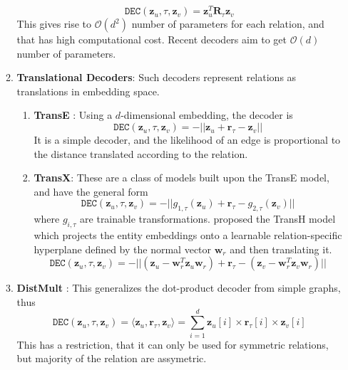\begin{enumerate}
\begin{enumerate}
	\begin{equation}
		\texttt{DEC}(\mathbf{z}_u, \tau, \mathbf{z}_v) = \mathbf{z}_u^T \mathbf{R}_\tau \mathbf{z}_v
	\end{equation}
	 This gives rise to $\mathcal{O}(d^2)$ number of parameters for each relation, and that has high computational cost. Recent decoders aim to get $\mathcal{O}(d)$ number of parameters.
	 \item \textbf{Translational Decoders}: Such decoders represent relations as translations in embedding space. 
	 \begin{enumerate}
	 	\item \textbf{TransE} \cite{transe}: Using a $d$-dimensional embedding, the decoder is
	 	\begin{equation}
	 		\texttt{DEC}(\mathbf{z}_u, \tau, \mathbf{z}_v) = -||\mathbf{z}_u + \mathbf{r}_\tau - \mathbf{z}_v||
	 	\end{equation}
 	It is a simple decoder, and the likelihood of an edge is proportional to the distance translated according to the relation.
 	\item \textbf{TransX}: These are a class of models built upon the TransE model, and have the general form
 	\begin{equation}
 		\texttt{DEC}(\mathbf{z}_u, \tau, \mathbf{z}_v) = -||g_{1, \tau}(\mathbf{z}_u) + \mathbf{r}_\tau - g_{2,\tau}(\mathbf{z}_v)||
 	\end{equation}
 where $g_{i,\tau}$ are trainable transformations. \cite{transh} proposed the TransH model which projects the entity embeddings onto a learnable relation-specific hyperplane defined by the normal vector $\mathbf{w}_r$ and then translating it.
 \begin{equation}
 	\texttt{DEC}(\mathbf{z}_u, \tau, \mathbf{z}_v) = -||(\mathbf{z}_u - \mathbf{w}_r^T \mathbf{z}_u \mathbf{w}_r) + \mathbf{r}_\tau - (\mathbf{z}_v - \mathbf{w}_r^T \mathbf{z}_v \mathbf{w}_r)||
 \end{equation}
	 \end{enumerate}
 \item \textbf{DistMult} \cite{distmult}: This generalizes the dot-product decoder from simple graphs, thus
 \begin{equation}
 	\texttt{DEC}(\mathbf{z}_u, \tau, \mathbf{z}_v) = \langle \mathbf{z}_u, \mathbf{r}_\tau, \mathbf{z}_v \rangle = \sum_{i=1}^d \mathbf{z}_u[i] \times \mathbf{r}_\tau[i] \times \mathbf{z}_v[i]
 \end{equation}
This has a restriction, that it can only be used for symmetric relations, but majority of the relation are assymetric.

\end{enumerate}
\end{enumerate}
